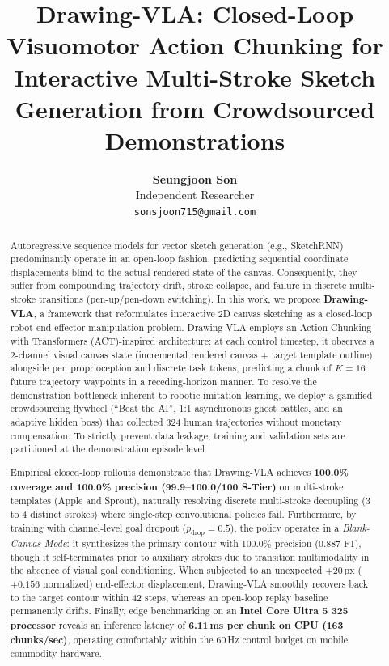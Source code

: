 \documentclass[10pt,twocolumn,letterpaper]{article}
\title{\LARGE \textbf{Drawing-VLA: Closed-Loop Visuomotor Action Chunking for Interactive Multi-Stroke Sketch Generation from Crowdsourced Demonstrations}}
\author{
  \textbf{Seungjoon Son}\\
  Independent Researcher\\
  \texttt{sonsjoon715@gmail.com}
}
\date{}
\begin{document}
\maketitle

\begin{abstract}
Autoregressive sequence models for vector sketch generation (e.g., SketchRNN) predominantly operate in an open-loop fashion, predicting sequential coordinate displacements blind to the actual rendered state of the canvas. Consequently, they suffer from compounding trajectory drift, stroke collapse, and failure in discrete multi-stroke transitions (pen-up/pen-down switching). In this work, we propose \textbf{Drawing-VLA}, a framework that reformulates interactive 2D canvas sketching as a closed-loop robot end-effector manipulation problem. Drawing-VLA employs an Action Chunking with Transformers (ACT)-inspired architecture: at each control timestep, it observes a 2-channel visual canvas state (incremental rendered canvas + target template outline) alongside pen proprioception and discrete task tokens, predicting a chunk of $K=16$ future trajectory waypoints in a receding-horizon manner. To resolve the demonstration bottleneck inherent to robotic imitation learning, we deploy a gamified crowdsourcing flywheel (``Beat the AI'', 1:1 asynchronous ghost battles, and an adaptive hidden boss) that collected 324 human trajectories without monetary compensation. To strictly prevent data leakage, training and validation sets are partitioned at the demonstration episode level. 

Empirical closed-loop rollouts demonstrate that Drawing-VLA achieves \textbf{100.0\% coverage and 100.0\% precision (99.9--100.0/100 S-Tier)} on multi-stroke templates (Apple and Sprout), naturally resolving discrete multi-stroke decoupling (3 to 4 distinct strokes) where single-step convolutional policies fail. Furthermore, by training with channel-level goal dropout ($p_{\text{drop}} = 0.5$), the policy operates in a \emph{Blank-Canvas Mode}: it synthesizes the primary contour with 100.0\% precision (0.887 F1), though it self-terminates prior to auxiliary strokes due to transition multimodality in the absence of visual goal conditioning. When subjected to an unexpected $+20\,\text{px}$ ($+0.156$ normalized) end-effector displacement, Drawing-VLA smoothly recovers back to the target contour within 42 steps, whereas an open-loop replay baseline permanently drifts. Finally, edge benchmarking on an \textbf{Intel Core Ultra 5 325 processor} reveals an inference latency of \textbf{6.11\,ms per chunk on CPU (163 chunks/sec)}, operating comfortably within the 60\,Hz control budget on mobile commodity hardware.
\end{abstract}
\end{document}
